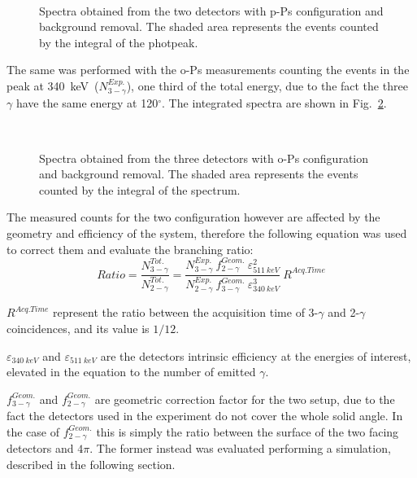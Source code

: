 \begin{figure}[H]
	\centering
	 \quad
		 \\
	\caption{Spectra obtained from the two detectors with p-Ps configuration and background removal. The shaded area represents the events counted by the integral of the photpeak. }
\label{Fig:1_2_integral}
\end{figure}
 
The same was performed with the o-Ps measurements counting the events in the peak at 340~keV~($N_{3-\gamma}^{Exp.}$), one third of the total energy, due to the fact the three $\gamma$ have the same energy at 120$^\circ$. The integrated spectra are shown in Fig.~\ref{Fig:1_2_3_integral}. 

\begin{figure}[H]
	\centering
	 \quad
		 \quad
		 \\
	\caption{Spectra obtained from the three detectors with o-Ps configuration and background removal. The shaded area represents the events counted by the integral of the spectrum. }
\label{Fig:1_2_3_integral}
\end{figure}

The measured counts for the two configuration however are affected by the geometry and efficiency of the system, therefore the following equation was used to correct them and evaluate the branching ratio:
\begin{equation*}
Ratio=\dfrac{N_{3-\gamma}^{Tot.}}{N_{2-\gamma}^{Tot.}}=\dfrac{N_{3-\gamma}^{Exp.}\ f_{2-\gamma}^{Geom.}\ \varepsilon_{511~keV}^2}{N_{2-\gamma}^{Exp.}\ f_{3-\gamma}^{Geom.}\ \varepsilon_{340~keV}^3}\ R^{Acq.Time}
\end{equation*}

$R^{Acq.Time}$ represent the ratio between the acquisition time of 3-$\gamma$ and 2-$\gamma$ coincidences, and its value is $1/12$.

$\varepsilon_{340~keV}$ and $\varepsilon_{511~keV}$ are the detectors intrinsic efficiency at the energies of interest, elevated in the equation to the number of emitted $\gamma$. 

$f_{3-\gamma}^{Geom.}$ and $f_{2-\gamma}^{Geom.}$ are geometric correction factor for the two setup, due to the fact the detectors used in the experiment do not cover the whole solid angle. In the case of $f_{2-\gamma}^{Geom.}$ this is simply the ratio between the surface of the two facing detectors and $4\pi$. The former instead was evaluated performing a simulation, described in the following section. 




